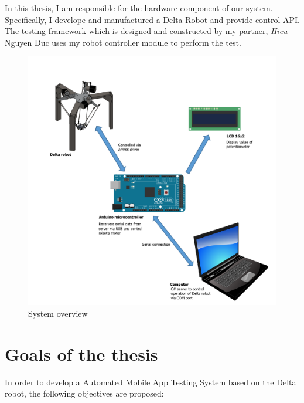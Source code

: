 In this thesis, I am responsible for the hardware component of our system. Specifically, I develope and manufactured a Delta Robot and provide control API. The testing framework which is designed and constructed by my partner, \textit{Hieu} Nguyen Duc uses my robot controller module to perform the test.

\begin{figure}[H]
	\centering
	\includegraphics[width=\maxwidth{15cm}, keepaspectratio]{Chapters/Fig/system_overview.png}
	\caption{System overview}
	\label{fig:system_overview}
\end{figure}

\section{Goals of the thesis}
In order to develop a Automated Mobile App Testing System based on the Delta robot, the following objectives are proposed:

